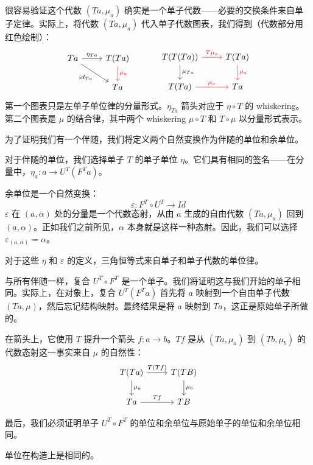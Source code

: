 \documentclass[DaoFP]{subfiles}
\begin{document}
很容易验证这个代数 $(T a, \mu_a)$ 确实是一个单子代数——必要的交换条件来自单子定律。实际上，将代数 $(T a, \mu_a)$ 代入单子代数图表，我们得到（代数部分用红色绘制）：
\[
 \begin{tikzcd}
 T a
 \arrow[r, "\eta_{T a}"]
 \arrow[dr, "id_{T a}"']
 & T(T a)
 \arrow[d, red, "\mu_a"]
 \\
 & T a
 \end{tikzcd}
  \hspace{30pt}
 \begin{tikzcd}
T(T(T a))
\arrow[r, red, "T \mu_a "]
\arrow[d, "\mu_{T a}"]
&T(T a)
\arrow[d, red, "\mu_a"]
\\
T (T a)
\arrow[r, red, "\mu_a"]
& T a
 \end{tikzcd}
\]
第一个图表只是左单子单位律的分量形式。$\eta_{T a}$ 箭头对应于 $\eta \circ T$ 的 whiskering。第二个图表是 $\mu$ 的结合律，其中两个 whiskering $\mu \circ T$ 和 $T \circ \mu$ 以分量形式表示。

为了证明我们有一个伴随，我们将定义两个自然变换作为伴随的单位和余单位。

对于伴随的单位，我们选择单子 $T$ 的单子单位 $\eta$。它们具有相同的签名——在分量中，$\eta_a \colon a \to U^T (F^T a)$。

余单位是一个自然变换：
\[ \varepsilon \colon F^T \circ U^T \to Id \]
$\varepsilon$ 在 $(a, \alpha)$ 处的分量是一个代数态射，从由 $a$ 生成的自由代数 $(T a, \mu_a)$ 回到 $(a, \alpha)$。正如我们之前所见，$\alpha$ 本身就是这样一种态射。因此，我们可以选择 $\varepsilon_{(a, \alpha)} = \alpha$。

对于这些 $\eta$ 和 $\varepsilon$ 的定义，三角恒等式来自单子和单子代数的单位律。

与所有伴随一样，复合 $U^T \circ F^T$ 是一个单子。我们将证明这与我们开始的单子相同。实际上，在对象上，复合 $U^T (F^T a)$ 首先将 $a$ 映射到一个自由单子代数 $(T a, \mu)$，然后忘记结构映射。最终结果是将 $a$ 映射到 $T a$，这正是原始单子所做的。

在箭头上，它使用 $T$ 提升一个箭头 $f \colon a \to b$。$T f$ 是从 $(T a, \mu_a)$ 到 $(T b, \mu_b)$ 的代数态射这一事实来自 $\mu$ 的自然性：
\[
 \begin{tikzcd}
 T (T a)
 \arrow[r, "T( T f)"]
 \arrow[d, "\mu_a"]
 & T (T B)
\arrow[d, "\mu_b"]
 \\
 T a
 \arrow[r, "T f"]
 & T B
  \end{tikzcd}
\]

最后，我们必须证明单子 $U^T \circ F^T$ 的单位和余单位与原始单子的单位和余单位相同。

单位在构造上是相同的。
\end{document}
